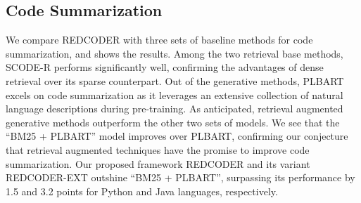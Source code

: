 \documentclass[11pt]{article}
\newcommand{\notesc}[1]{\textcolor{purple}{\bf\small [#1 --Saikat]}}
\newcommand{\tool}{{REDCODER}\xspace}
\newcommand{\toolext}{{REDCODER-EXT}\xspace}
\newcommand{\coder}{SCODE-R\xspace}
\begin{document}
     
    \begin{comment}For an example, a summary asks to write a Java code of getting a MuxerStream given a postion. 
    \notesc{What is the point of describing things that are not in the main paper? The paper is supposed to be self-containing.} In 
Appendix,
    we show corresponding retrieved code, their summaries, PLBART's and our generations. As can be seen, PLBART generates a basic but relevant code, both retrieved code (rank-1 and rank-3 showed) contains the statements with variable ``cPtr'' one of them is of Muxer class and another is from DeMuxer class. \tool generates a somewhat correct code of MuxerStream class  and it takes the position argument too. Seemingly, while fusing the retrieved code as the input summary does not match rank-3 retrieved code's name, it only take the line with ``cPtr'' from that retrieved code  and the function definition from the rank-1 code. Now when we are allowed to leverage the summaries of the retrieved code, \toolext can match the summary of the rank-3 retrieved code with the input and that's why it produces the Muxer class object but with the ``throw exceptions'' from the rank-3 retrieved code. Similarly the results on Concode benchmark are in Table \ref{table:concode}. \tool achieves the state-of-the-art EM and CodeBLEU results and \toolext achieves the best BLEU score. 
    \end{comment}

    \subsection{Code Summarization}
    \label{sec:exp-result-codesum}
    
    We compare \tool with three sets of baseline methods for code summarization, and  shows the results.  
    Among the two retrieval base methods, \coder performs significantly well, confirming the advantages of dense retrieval over its sparse counterpart.
    Out of the generative methods, PLBART excels on code summarization as it leverages an extensive collection of natural language descriptions during pre-training.
    As anticipated, retrieval augmented generative methods outperform the other two sets of models.
    We see that the ``BM25 + PLBART'' model improves over PLBART, confirming our conjecture that retrieval augmented techniques have the promise to improve code summarization.
    Our proposed framework \tool and its variant \toolext outshine ``BM25 + PLBART'', surpassing its performance by 1.5 and 3.2 points for Python and Java languages, respectively.
\end{document}
